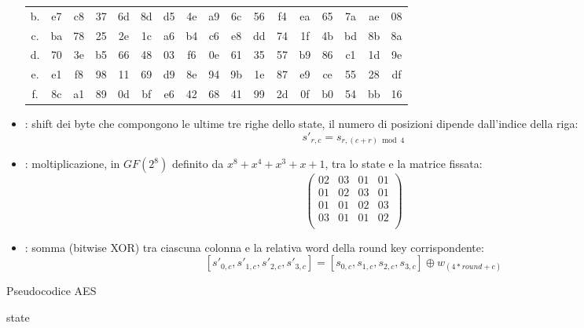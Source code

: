 \documentclass[target=bach,aauheader=,style=]{thud}
\begin{document}
\begin{itemize}
\begin{table}[h!]
\begin{tabular}{|c|cccccccccccccccc|}
						b. & e7 & c8 & 37 & 6d & 8d & d5 & 4e & a9 & 6c & 56 & f4 & ea & 65 & 7a & ae & 08 \\
						c. & ba & 78 & 25 & 2e & 1c & a6 & b4 & c6 & e8 & dd & 74 & 1f & 4b & bd & 8b & 8a \\
						d. & 70 & 3e & b5 & 66 & 48 & 03 & f6 & 0e & 61 & 35 & 57 & b9 & 86 & c1 & 1d & 9e \\
						e. & e1 & f8 & 98 & 11 & 69 & d9 & 8e & 94 & 9b & 1e & 87 & e9 & ce & 55 & 28 & df \\
						f. & 8c & a1 & 89 & 0d & bf & e6 & 42 & 68 & 41 & 99 & 2d & 0f & b0 & 54 & bb & 16 \\
						\hline
					\end{tabular}
				\end{table}
				\item {} : shift dei byte che compongono le ultime tre righe dello state, il numero di posizioni dipende dall'indice della riga:
				\[s'_{r,c} = s_{r,(c+r) \bmod 4}\]
				\item {} : moltiplicazione, in $GF(2^8)$ definito da $x^8+x^4+x^3+x+1$, tra lo state e la matrice fissata:
				\[
				\begin{pmatrix}
					02 & 03 & 01 & 01 \\
					01 & 02 & 03 & 01 \\
					01 & 01 & 02 & 03 \\
					03 & 01 & 01 & 02 \\
				\end{pmatrix}
				\]
				\item {} : somma (bitwise XOR) tra ciascuna colonna e la relativa word della round key corrispondente:
				\[[s'_{0,c},s'_{1,c},s'_{2,c},s'_{3,c}] = [s_{0,c},s_{1,c},s_{2,c},s_{3,c}] \oplus w_{(4*round+c)}\]
			\end{itemize}
			
			\begin{algorithm}
				\caption{Pseudocodice AES}
				\begin{algorithmic}
						\EndFor
						\Return state
					\EndProcedure
				\end{algorithmic}
			\end{algorithm}
			
\end{document}
